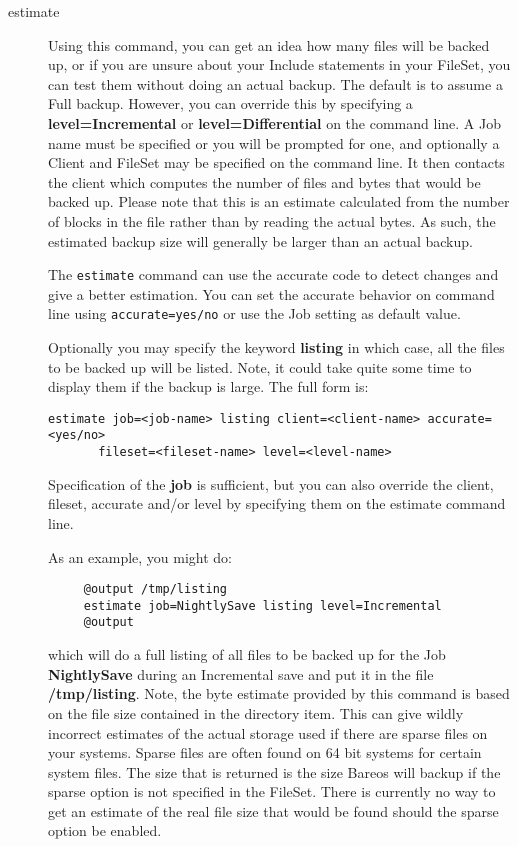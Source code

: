 \begin{description}
\label{estimate}
\item [estimate]
   Using this command, you can get an idea how many files will be backed
   up, or if you are unsure about your Include statements in your FileSet,
   you can test them without doing an actual backup.  The default is to
   assume a Full backup.  However, you can override this by specifying a
   {\bf level=Incremental} or {\bf level=Differential} on the command line.
   A Job name must be specified or you will be prompted for one, and
   optionally a Client and FileSet may be specified on the command line.
   It then contacts the client which computes the number of files and bytes
   that would be backed up.  Please note that this is an estimate
   calculated from the number of blocks in the file rather than by reading
   the actual bytes.  As such, the estimated backup size will generally be
   larger than an actual backup.

   The \texttt{estimate} command can use the accurate code to detect changes
   and give a better estimation. You can set the accurate behavior on command
   line using \texttt{accurate=yes/no} or use the Job setting as default value.

   Optionally you may specify the keyword {\bf listing} in  which case, all the
   files to be backed up will be listed.  Note, it could take quite some time to
   display them if the  backup is large. The full form is:

\begin{verbatim}
estimate job=<job-name> listing client=<client-name> accurate=<yes/no>
       fileset=<fileset-name> level=<level-name>
\end{verbatim}

   Specification of the {\bf job} is sufficient, but you can also override the
   client, fileset, accurate and/or level by specifying them on the estimate
   command line.


As an example, you might do:

\footnotesize
\begin{verbatim}
     @output /tmp/listing
     estimate job=NightlySave listing level=Incremental
     @output
\end{verbatim}
\normalsize

   which will do a full listing of all files to be backed up for the  Job {\bf
   NightlySave} during an Incremental save and put it in the  file {\bf
   /tmp/listing}.  Note, the byte estimate provided by this command is
   based on the file size contained in the directory item. This can give
   wildly incorrect estimates of the actual storage used if there are
   sparse files on your systems. Sparse files are often found on 64 bit
   systems for certain system files. The size that is returned is the size
   Bareos will backup if the sparse option is not specified in the FileSet.
   There is currently no way to get an estimate of the real file size that
   would be found should the sparse option be enabled.


\end{description}

